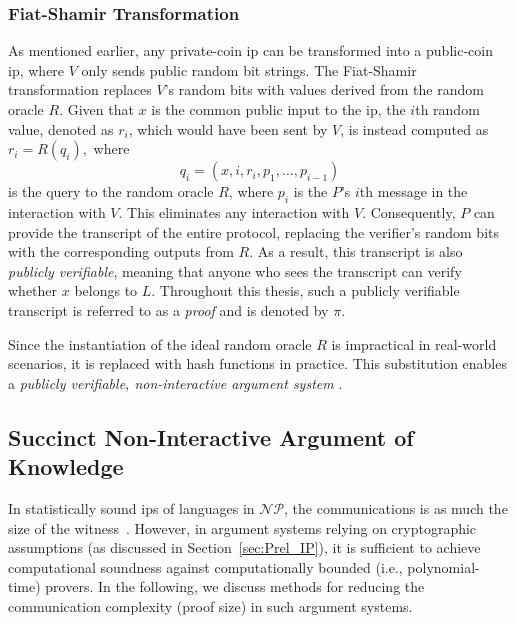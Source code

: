 \subsubsection{Fiat-Shamir Transformation}
As mentioned earlier, any private-coin \gls{ip} can be transformed into a public-coin \gls{ip}, where \( V \) only sends public random bit strings. The Fiat-Shamir transformation replaces \( V \)'s random bits with values derived from the random oracle \( R \). Given that \( x \) is the common public input to the \gls{ip}, the \( i \)th random value, denoted as \( r_i \), which would have been sent by \( V \), is instead computed as 
\(
r_i = R(q_i),
\)
where 
\[
q_i = (x, i, r_i, p_1, \dots, p_{i-1}) 
\]
is the query to the random oracle \( R \), where $p_i$ is the $P$'s $i$th message in the interaction with $V$. This eliminates any interaction with \( V \). Consequently, \( P \) can provide the transcript of the entire protocol, replacing the verifier's random bits with the corresponding outputs from \( R \). As a result, this transcript is also \textit{publicly verifiable}, meaning that anyone who sees the transcript can verify whether \( x \) belongs to \( L \). Throughout this thesis, such a publicly verifiable transcript is referred to as a \textit{proof} and is denoted by $\pi$.

Since the instantiation of the ideal random oracle \( R \) is impractical in real-world scenarios, it is replaced with hash functions in practice. This substitution enables a \textit{publicly verifiable, non-interactive argument system} \cite{Thaler2022Proofs}.

\subsection{Succinct Non-Interactive Argument of Knowledge}

In statistically sound \gls{ip}s of languages in $\mathcal{NP}$, the communications is as much the size of the witness~\cite{Nitulescu2019Lattice}. However, in argument systems relying on cryptographic assumptions (as discussed in Section~\ref{sec:Prel_IP}), it is sufficient to achieve computational soundness against computationally bounded (i.e., polynomial-time) provers. In the following, we discuss methods for reducing the communication complexity (proof size) in such argument systems.

